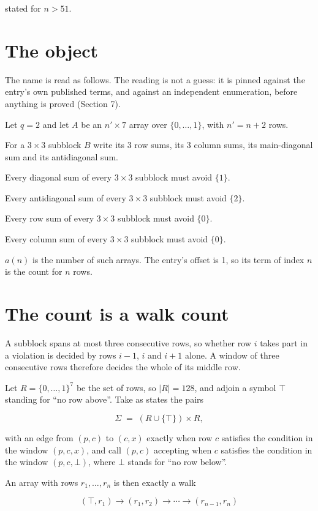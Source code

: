 \documentclass[11pt]{article}
\theoremstyle{definition}
\begin{document}
stated for $n > 51$.

\section{The object}

The name is read as follows. The reading is not a guess: it is pinned against the entry's own published terms, and against an independent enumeration, before anything is proved (Section 7).

Let $q = 2$ and let $A$ be an $n' \times 7$ array over $\{0,\dots,1\}$, with $n' = n + 2$ rows.

For a $3\times3$ subblock $B$ write its 3 row sums, its 3 column sums, its main-diagonal sum and its antidiagonal sum.

Every diagonal sum of every $3\times3$ subblock must avoid $\{1\}$.

Every antidiagonal sum of every $3\times3$ subblock must avoid $\{2\}$.

Every row sum of every $3\times3$ subblock must avoid $\{0\}$.

Every column sum of every $3\times3$ subblock must avoid $\{0\}$.

$a(n)$ is the number of such arrays. The entry's offset is 1, so its term of index $n$ is the count for $n$ rows.

\section{The count is a walk count}

A subblock spans at most three consecutive rows, so whether row $i$ takes part in a violation is decided by rows $i-1$, $i$ and $i+1$ alone. A window of three consecutive rows therefore decides the whole of its middle row.

Let $R = \{0,\dots,1\}^{7}$ be the set of rows, so $|R| = 128$, and adjoin a symbol $\top$ standing for ``no row above''. Take as states the pairs

\[\Sigma \;=\; (R \cup \{\top\}) \times R,\]

with an edge from $(p,c)$ to $(c,x)$ exactly when row $c$ satisfies the condition in the window $(p,c,x)$, and call $(p,c)$ accepting when $c$ satisfies the condition in the window $(p,c,\bot)$, where $\bot$ stands for ``no row below''.

An array with rows $r_1,\dots,r_n$ is then exactly a walk

\[(\top,r_1) \to (r_1,r_2) \to \cdots \to (r_{n-1},r_n)\]
\end{document}
